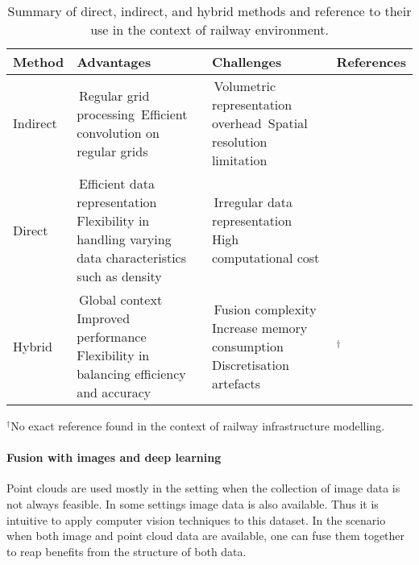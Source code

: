 \begin{table}[!ht]
    \centering
    \begin{tabular}{%
	>{\raggedright\arraybackslash}p{1.58cm}
	>{\raggedright\arraybackslash}p{3.58cm}
	>{\raggedright\arraybackslash}p{3.58cm}
	>{\raggedright\arraybackslash}p{1.58cm}}\toprule
         \textbf{Method} & \textbf{Advantages} & \textbf{Challenges} & \textbf{References} \\\midrule
	Indirect & 
	 \textbullet\,Regular grid processing 
	\textbullet\,Efficient convolution on regular grids
	& 
	\textbullet\,Volumetric representation overhead
	\textbullet\,Spatial resolution limitation
	& \cite{corongiu2020classification,lin2020lidar,manier2022railway,yu2022real-time} \\ \addlinespace
	
	Direct & 
	\textbullet\,Efficient data representation 
	\textbullet\,Flexibility in handling varying data characteristics such as density
	& 
	\textbullet\,Irregular data representation
	\textbullet\,High computational cost 
	& 
	\cite{chen2020deep,dibari2021semantic,grandio2022point} \\ \addlinespace
	
	Hybrid & 
	\textbullet\,Global context
	\textbullet\,Improved performance 
	\textbullet\,Flexibility in balancing efficiency and accuracy
	& 
	\textbullet\,Fusion complexity 
	\textbullet\,Increase memory consumption
	\textbullet\,Discretisation artefacts
	& \cite{liu2021an}$^\dag$ \\\bottomrule
    \end{tabular}
    \raggedright $^\dag$No exact reference found in the context of railway infrastructure modelling.
    \caption{Summary of direct, indirect, and hybrid methods and reference to their use in the context of railway environment.}
    \label{tab:stoa:deep_learning_summary}
\end{table}

\paragraph{Fusion with images and deep learning}
Point clouds are used mostly in the setting when the collection of image data is not always feasible. In some settings image data is also available. Thus it is intuitive to apply computer vision techniques to this dataset. In the scenario when both image and point cloud data are available, one can fuse them together to reap benefits from the structure of both data. 

